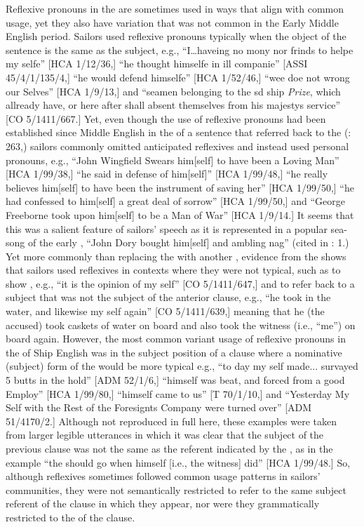 Reflexive pronouns in the  are sometimes used in ways that align with common usage, yet they also have variation that was not common in the Early Middle English period. Sailors used reflexive pronouns typically when the object of the sentence is the same as the subject, e.g., “I…haveing no mony nor frinds to helpe my selfe” [HCA 1/12/36,] “he thought himselfe in ill companie” [ASSI 45/4/1/135/4,] “he would defend himselfe” [HCA 1/52/46,] “wee doe not wrong our Selves” [HCA 1/9/13,] and “seamen belonging to the sd ship \textit{ Prize}, which allready have, or here after shall absent themselves from his majestys service” [CO 5/1411/667.] Yet, even though the use of reflexive pronouns had been established since Middle English in the  of a sentence that referred back to the  (\citealt{MillwardHayes2012}: 263,) sailors commonly omitted anticipated reflexives and instead used  personal pronouns, e.g., “John Wingfield Swears him[self] to have been a Loving Man” [HCA 1/99/38,] “he said in defense of him[self]” [HCA 1/99/48,] “he really believes him[self] to have been the instrument of saving her” [HCA 1/99/50,] “he had confessed to him[self] a great deal of sorrow” [HCA 1/99/50,] and “George Freeborne took upon him[self] to be a Man of War” [HCA 1/9/14.] It seems that this was a salient feature of sailors’ speech as it is represented in a popular sea-song of the early , “John Dory bought him[self] and ambling nag” (cited in \citealt{Palmer1986}: 1.) Yet more commonly than replacing the  with another , evidence from the  shows that sailors used reflexives in contexts where they were not typical, such as to show , e.g., “it is the opinion of my self” [CO 5/1411/647,] and to refer back to a subject that was not the subject of the anterior clause, e.g., “he took in the water, and likewise my self again” [CO 5/1411/639,] meaning that he (the accused) took caskets of water on board and also took the witness (i.e., “me”) on board again. However, the most common variant usage of reflexive pronouns in the  of Ship English was in the subject position of a clause where a nominative (subject) form of the  would be more typical e.g., “to day my self made... survayed 5 butts in the hold” [ADM 52/1/6,] “himself was beat, and forced from a good Employ” [HCA 1/99/80,] “himself came to us” [T 70/1/10,] and “Yesterday My Self with the Rest of the Foresignts Company were turned over” [ADM 51/4170/2.] Although not reproduced in full here, these examples were taken from larger legible utterances in which it was clear that the subject of the previous clause was not the same as the referent indicated by the , as in the example “the  should go when himself [i.e., the witness] did” [HCA 1/99/48.] So, although reflexives sometimes followed common usage patterns in sailors’ communities, they were not semantically restricted to refer to the same subject referent of the clause in which they appear, nor were they grammatically restricted to the  of the clause. 

